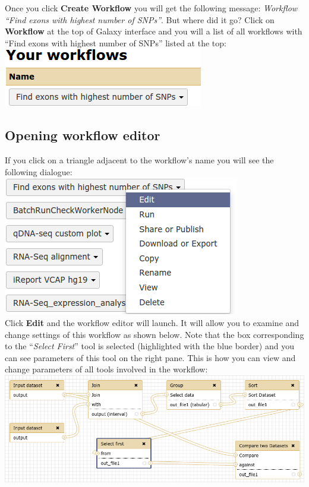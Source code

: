 \documentclass[11pt,a4paper]{article}
\begin{document}
Once you click \textbf{Create Workflow} you will get the following message: \textit{Workflow ``Find exons with highest number of SNPs''}. But where did it go? Click on \textbf{Workflow} at the top of Galaxy interface and you will a list of all workflows with ``Find exons with highest number of SNPs'' listed at the top:\\
\includegraphics[scale=0.55]{figures/101_26}\\
\subsection{Opening workflow editor}
If you click on a triangle adjacent to the workflow's name you will see the following dialogue:\\
\includegraphics[scale=0.55]{figures/101_27}\\
Click \textbf{Edit} and the workflow editor will launch. It will allow you to examine and change settings of this workflow as shown below. Note that the box corresponding to the ``\textit{Select First}'' tool is selected (highlighted with the blue border) and you can see parameters of this tool on the right pane. This is how you can view and change parameters of all tools involved in the workflow:\\
\includegraphics[width=\textwidth]{figures/101_28}\\
\end{document}
